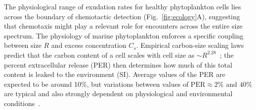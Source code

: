 \documentclass[9pt,twocolumn,twoside]{pnas-new}
\begin{document}

The physiological range of exudation rates for healthy phytoplankton cells lies across the boundary of chemotactic detection (Fig.~\ref{fig:ecology}A), suggesting that chemotaxis might play a relevant role for encounters across the entire size spectrum. The physiology of marine phytoplankton enforces a specific coupling between size $R$ and excess concentration $C_s$.
Empirical carbon-size scaling laws predict that the carbon content of a cell scales with cell size as $\sim R^{2.28}$~\cite{mullin1966relationship}; the percent extracellular release (PER) then determines how much of this total content is leaked to the environment (SI).
Average values of the PER are expected to be around 10\%, but variations between values of $\mathrm{PER}\approx 2\%$ and $40\%$ are typical and also strongly dependent on physiological and environmental conditions~\cite{maranon2004significance}.
\end{document}

